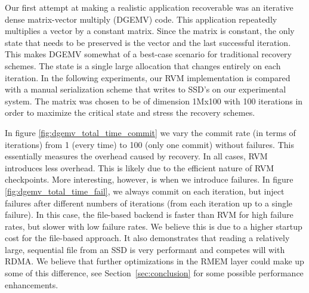 Our first attempt at making a realistic application recoverable was an
iterative dense matrix-vector multiply (DGEMV) code. This application
repeatedly multiplies a vector by a constant matrix. Since the matrix is
constant, the only state that needs to be preserved is the vector and the last
successful iteration. This makes DGEMV somewhat of a best-case scenario for
traditional recovery schemes. The state is a single large allocation that
changes entirely on each iteration. In the following experiments, our RVM
implementation is compared with a manual serialization scheme that writes to
SSD's on our experimental system. The matrix was chosen to be of dimension
1Mx100 with 100 iterations in order to maximize the critical state and stress
the recovery schemes.


In figure \ref{fig:dgemv_total_time_commit} we vary the commit rate (in terms
of iterations) from 1 (every time) to 100 (only one commit) without failures.
This essentially measures the overhead caused by recovery. In all cases, RVM
introduces less overhead. This is likely due to the efficient nature of RVM
checkpoints. More interesting, however, is when we introduce failures. In
figure \ref{fig:dgemv_total_time_fail}, we always commit on each iteration, but
inject failures after different numbers of iterations (from each iteration up
to a single failure). In this case, the file-based backend is faster than RVM
for high failure rates, but slower with low failure rates. We believe this is
due to a higher startup cost for the file-based approach. It also demonstrates
that reading a relatively large, sequential file from an SSD is very performant
and competes will with RDMA. We believe that further optimizations in the RMEM
layer could make up some of this difference, see Section~\ref{sec:conclusion}
for some possible performance enhancements.

